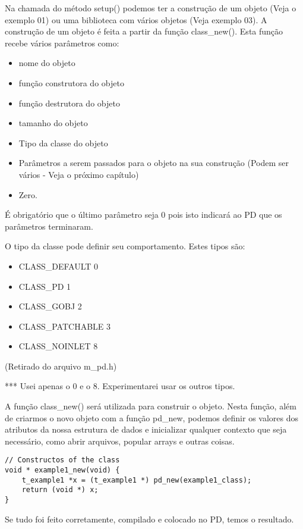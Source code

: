 Na chamada do método setup() podemos ter a construção de um objeto (Veja o
exemplo 01) ou uma biblioteca com vários objetos (Veja exemplo 03). A
construção de um objeto é feita a partir da função class\_new(). Esta função
recebe vários parâmetros como:

\begin{itemize}
\item nome do objeto
\item função construtora do objeto
\item função destrutora do objeto
\item tamanho do objeto
\item Tipo da classe do objeto
\item Parâmetros a serem passados para o objeto na sua construção (Podem ser vários - Veja o próximo capítulo)
\item Zero.
\end{itemize}

É obrigatório que o último parâmetro seja 0 pois isto indicará ao PD que os
parâmetros terminaram.

O tipo da classe pode definir seu comportamento. Estes tipos são:

\begin{itemize}
\item CLASS\_DEFAULT 0
\item CLASS\_PD 1
\item CLASS\_GOBJ 2
\item CLASS\_PATCHABLE 3
\item CLASS\_NOINLET 8
\end{itemize}

(Retirado do arquivo m\_pd.h)

*** Usei apenas o 0 e o 8. Experimentarei usar os outros tipos.

A função class\_new() será utilizada para construir o objeto. Nesta função,
além de criarmos o novo objeto com a função pd\_new, podemos definir os
valores dos atributos da nossa estrutura de dados e inicializar qualquer
contexto que seja necessário, como abrir arquivos, popular arrays e outras
coisas.

\begin{lstlisting}
// Constructos of the class
void * example1_new(void) {
    t_example1 *x = (t_example1 *) pd_new(example1_class);
    return (void *) x;
}
\end{lstlisting}

Se tudo foi feito corretamente, compilado e colocado no PD, temos o resultado.

